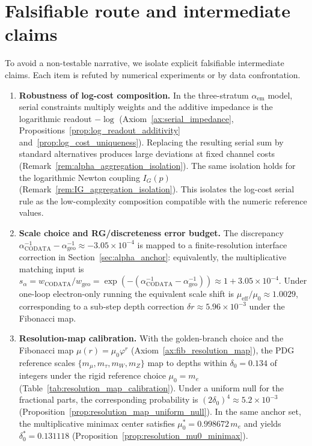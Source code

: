 \section{Falsifiable route and intermediate claims}
\label{sec:falsifiability}

To avoid a non-testable narrative, we isolate explicit falsifiable intermediate claims. Each item is refuted by numerical experiments or by data confrontation.

\begin{enumerate}
    \item \textbf{Robustness of log-cost composition.} In the three-stratum $\alpha_{\mathrm{em}}$ model, serial constraints multiply weights and the additive impedance is the logarithmic readout $-\log$ (Axiom~\ref{ax:serial_impedance}, Propositions~\ref{prop:log_readout_additivity} and~\ref{prop:log_cost_uniqueness}). Replacing the resulting serial sum by standard alternatives produces large deviations at fixed channel costs (Remark~\ref{rem:alpha_aggregation_isolation}). The same isolation holds for the logarithmic Newton coupling $I_G(p)$ (Remark~\ref{rem:IG_aggregation_isolation}). This isolates the log-cost serial rule as the low-complexity composition compatible with the numeric reference values.

    \item \textbf{Scale choice and RG/discreteness error budget.} The discrepancy $\alpha_{\mathrm{CODATA}}^{-1}-\alpha_{\mathrm{geo}}^{-1}\approx -3.05\times 10^{-4}$ is mapped to a finite-resolution interface correction in Section~\ref{sec:alpha_anchor}: equivalently, the multiplicative matching input is $s_\alpha=w_{\mathrm{CODATA}}/w_{\mathrm{geo}}=\exp(-(\alpha_{\mathrm{CODATA}}^{-1}-\alpha_{\mathrm{geo}}^{-1}))\approx 1+3.05\times 10^{-4}$. Under one-loop electron-only running the equivalent scale shift is $\mu_{\mathrm{eff}}/\mu_0\approx 1.0029$, corresponding to a sub-step depth correction $\delta r\approx 5.96\times 10^{-3}$ under the Fibonacci map.

    \item \textbf{Resolution-map calibration.} With the golden-branch choice and the Fibonacci map $\mu(r)=\mu_0\varphi^r$ (Axiom~\ref{ax:fib_resolution_map}), the PDG reference scales $\{m_\mu,m_\tau,m_W,m_Z\}$ map to depths within $\delta_0=0.134$ of integers under the rigid reference choice $\mu_0=m_e$ (Table~\ref{tab:resolution_map_calibration}). Under a uniform null for the fractional parts, the corresponding probability is $(2\delta_0)^4\approx 5.2\times 10^{-3}$ (Proposition~\ref{prop:resolution_map_uniform_null}). In the same anchor set, the multiplicative minimax center satisfies $\mu_0^*=0.998672\,m_e$ and yields $\delta_0^*=0.131118$ (Proposition~\ref{prop:resolution_mu0_minimax}).


\end{enumerate}
